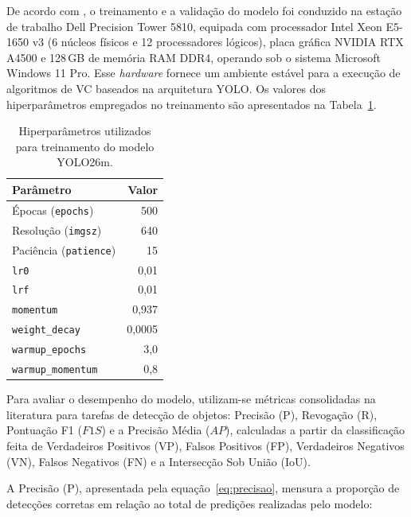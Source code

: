 De acordo com , o treinamento e a validação do modelo foi conduzido na estação de trabalho Dell Precision Tower 5810, equipada com processador Intel Xeon E5-1650 v3 (6 núcleos físicos e 12 processadores lógicos), placa gráfica NVIDIA RTX A4500 e 128\,GB de memória RAM DDR4, operando sob o sistema Microsoft Windows 11 Pro. Esse \textit{hardware} fornece
um ambiente estável para a execução de algoritmos de VC baseados na arquitetura YOLO. Os valores dos hiperparâmetros empregados no treinamento são apresentados na Tabela~\ref{tab:hiperparametros}.

\begin{table}[htbp]
  \centering
  \caption{Hiperparâmetros utilizados para treinamento do modelo YOLO26m.}
  \label{tab:hiperparametros}
  \begin{tabular}{lr}
    \hline
    \rowcolor{gray!20}
    \textbf{Parâmetro} & \textbf{Valor} \\
    \hline
    Épocas (\texttt{epochs}) & 500 \\
    Resolução (\texttt{imgsz}) & 640 \\
    Paciência (\texttt{patience}) & 15 \\
    \texttt{lr0} & 0,01 \\
    \texttt{lrf} & 0,01 \\
    \texttt{momentum} & 0,937 \\
    \texttt{weight\_decay} & 0,0005 \\
    \texttt{warmup\_epochs} & 3,0 \\
    \texttt{warmup\_momentum} & 0,8 \\
    \hline
  \end{tabular}
  \begin{center}
  \end{center}
  
\end{table}

Para avaliar o desempenho do modelo, utilizam-se métricas consolidadas na literatura para tarefas de detecção de objetos: Precisão (P), Revogação (R), Pontuação F1 ($F1S$) e a Precisão Média ($AP$), calculadas a partir da classificação feita de Verdadeiros Positivos (VP), Falsos Positivos (FP), Verdadeiros Negativos (VN), Falsos Negativos (FN) e a Intersecção Sob União (IoU).

A Precisão (P), apresentada pela equação~\eqref{eq:precisao}, mensura a proporção de detecções corretas em relação ao total de predições realizadas pelo modelo:

